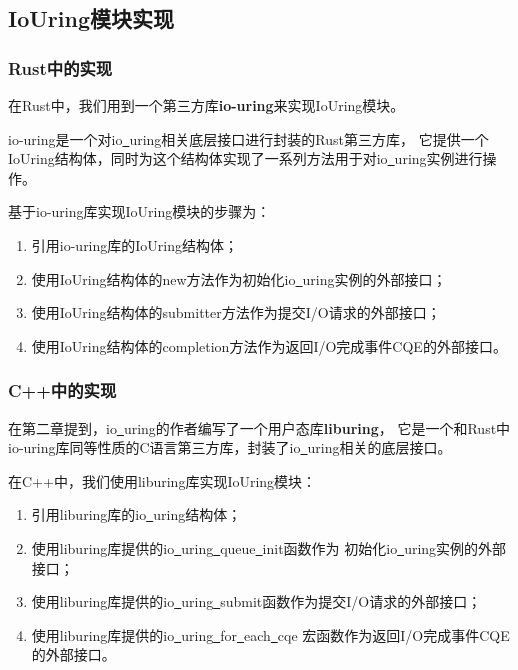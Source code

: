 \documentclass[supercite]{HustGraduPaper}
\theoremstyle{definition}
\begin{document}
\subsection{IoUring模块实现}

\subsubsection{Rust中的实现}

在Rust中，我们用到一个第三方库\textbf{io-uring}来实现IoUring模块。\par

io-uring是一个对io\underline{~}uring相关底层接口进行封装的Rust第三方库，
它提供一个IoUring结构体，同时为这个结构体实现了一系列方法用于对io\underline{~}uring实例进行操作。\par

基于io-uring库实现IoUring模块的步骤为：

\begin{enumerate}
  \item 引用io-uring库的IoUring结构体；
  \item 使用IoUring结构体的new方法作为初始化io\underline{~}uring实例的外部接口；
  \item 使用IoUring结构体的submitter方法作为提交I/O请求的外部接口；
  \item 使用IoUring结构体的completion方法作为返回I/O完成事件CQE的外部接口。
\end{enumerate}

\subsubsection{C++中的实现}

在第二章提到，io\underline{~}uring的作者编写了一个用户态库\textbf{liburing}，
它是一个和Rust中io-uring库同等性质的C语言第三方库，封装了io\underline{~}uring相关的底层接口。\par

在C++中，我们使用liburing库实现IoUring模块：

\begin{enumerate}
  \item 引用liburing库的io\underline{~}uring结构体；
  \item 使用liburing库提供的io\underline{~}uring\underline{~}queue\underline{~}init函数作为
    初始化io\underline{~}uring实例的外部接口；
  \item 使用liburing库提供的io\underline{~}uring\underline{~}submit函数作为提交I/O请求的外部接口；
  \item 使用liburing库提供的io\underline{~}uring\underline{~}for\underline{~}each\underline{~}cqe
    宏函数作为返回I/O完成事件CQE的外部接口。
\end{enumerate}
\end{document}
